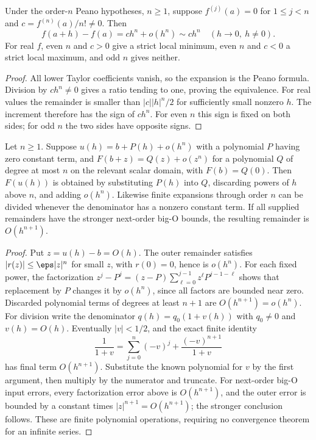 \begin{proposition}
Under the order-$n$ Peano hypotheses, $n\ge1$, suppose $f^{(j)}(a)=0$ for $1\le j<n$ and $c=f^{(n)}(a)/n!\ne0$. Then
\[ f(a+h)-f(a)=ch^n+o(h^n)\sim ch^n\quad(h\to0,\ h\ne0). \]
For real $f$, even $n$ and $c>0$ give a strict local minimum, even $n$ and $c<0$ a strict local maximum, and odd $n$ gives neither.
\end{proposition}
\begin{proof}
All lower Taylor coefficients vanish, so the expansion is the Peano formula. Division by $ch^n\ne0$ gives a ratio tending to one, proving the equivalence. For real values the remainder is smaller than $|c||h|^n/2$ for sufficiently small nonzero $h$. The increment therefore has the sign of $ch^n$. For even $n$ this sign is fixed on both sides; for odd $n$ the two sides have opposite signs.
\end{proof}

\begin{proposition}
Let $n\ge1$. Suppose $u(h)=b+P(h)+o(h^n)$ with a polynomial $P$ having zero constant term, and $F(b+z)=Q(z)+o(z^n)$ for a polynomial $Q$ of degree at most $n$ on the relevant scalar domain, with $F(b)=Q(0)$. Then $F(u(h))$ is obtained by substituting $P(h)$ into $Q$, discarding powers of $h$ above $n$, and adding $o(h^n)$. Likewise finite expansions through order $n$ can be divided whenever the denominator has a nonzero constant term. If all supplied remainders have the stronger next-order big-O bounds, the resulting remainder is $O(h^{n+1})$.
\end{proposition}
\begin{proof}
Put $z=u(h)-b=O(h)$. The outer remainder satisfies $|r(z)|\le\eps|z|^n$ for small $z$, with $r(0)=0$, hence is $o(h^n)$. For each fixed power, the factorization $z^j-P^j=(z-P)\sum_{\ell=0}^{j-1}z^\ell P^{j-1-\ell}$ shows that replacement by $P$ changes it by $o(h^n)$, since all factors are bounded near zero. Discarded polynomial terms of degrees at least $n+1$ are $O(h^{n+1})=o(h^n)$.
For division write the denominator $q(h)=q_0(1+v(h))$ with $q_0\ne0$ and $v(h)=O(h)$. Eventually $|v|<1/2$, and the exact finite identity
\[ \frac1{1+v}=\sum_{j=0}^n(-v)^j+\frac{(-v)^{n+1}}{1+v} \]
has final term $O(h^{n+1})$. Substitute the known polynomial for $v$ by the first argument, then multiply by the numerator and truncate. For next-order big-O input errors, every factorization error above is $O(h^{n+1})$, and the outer error is bounded by a constant times $|z|^{n+1}=O(h^{n+1})$; the stronger conclusion follows. These are finite polynomial operations, requiring no convergence theorem for an infinite series.
\end{proof}


